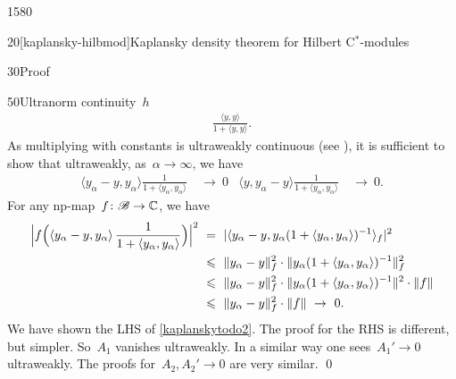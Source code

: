 \begin{parsec}{1580}
\begin{point}{20}[kaplansky-hilbmod]{Kaplansky density theorem for Hilbert C$^*$-modules}
\begin{point}{30}{Proof}
\begin{point}{50}{Ultranorm continuity~$h$}
\begin{align*}
            \frac{\langle y,y \rangle}{1+\langle y,y \rangle}.
\end{align*}
As multiplying with
constants is ultraweakly continuous (see ),
    it is sufficient to show that ultraweakly, as~$\alpha \to \infty$, we have
\begin{align}\label{kaplanskytodo2}
    \langle y_\alpha - y, y_\alpha \rangle \frac{1}{1 + \langle y_\alpha, y_\alpha\rangle} & \ \to\  0 &
    \langle y, y_\alpha  -y\rangle \frac{1}{1 + \langle y_\alpha, y_\alpha\rangle} & \ \to \ 0.
\end{align}
For any np-map~$f\colon \mathscr{B} \to \mathbb{C}$, we have
\begin{align*}
   \Bigl| f\Bigl(\left\langle y_\alpha - y, y_\alpha \right\rangle \frac{1}{1+\langle y_\alpha, y_\alpha\rangle}\Bigr)\Bigr|^2
    & \ = \ 
    |\langle y_\alpha - y, y_\alpha (1 + \langle y_\alpha, y_\alpha  \rangle)^{-1}
    \rangle_f|^2 \\
    & \ \leq \ 
    \| y_\alpha - y \|^2_f \cdot \| y_\alpha (1 + \langle y_\alpha, y_\alpha  \rangle)^{-1} \|^2_f \\
    & \ \leq \  \|
    y_\alpha - y \|^2_f \cdot \| y_\alpha (1 + \langle y_\alpha, y_\alpha  \rangle)^{-1} \|^2 \cdot
    \|f\|
    \\
    & \ \leq \ 
    \| y_\alpha - y \|^2_f \cdot \|f\| \ \rightarrow \ 0.
\end{align*}
We have shown the LHS of \eqref{kaplanskytodo2}.
The proof for the RHS is different, but simpler.
So~$A_1$ vanishes ultraweakly.
In a similar way one sees~$A_1' \to 0$ ultraweakly.
The proofs for~$A_2, A_2' \to 0$ are very similar. \qed
\end{point}
\end{point}
\end{point}
\end{parsec}

